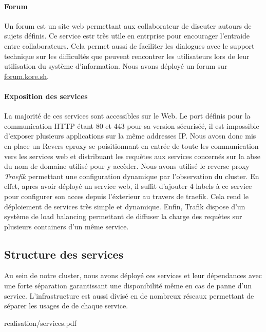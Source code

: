 \paragraph{Forum} Un forum est un site web permettant aux collaborateur de discuter autours de sujets définis.
Ce service estr très utile en entrprise pour encourager l'entraide entre collaborateurs.
Cela permet aussi de faciliter les dialogues avec le support technique sur les difficultés que peuvent rencontrer les utilisateurs lors de leur utilisation du système d'information.
Nous avons déployé un forum sur \url{forum.kore.sh}.

\paragraph{Exposition des services} La majorité de ces services sont accessibles sur le Web.
Le port définis pour la communication HTTP étant 80 et 443 pour sa version sécuriséé, il est impossible d'exposer plusieurs applications sur la même addresses IP.
Nous avosn donc mis en place un Revers eproxy se poisitionnant en entrée de toute les communication vers les services web et distribuant les requètes aux services concernés sur la abse du nom de domaine utilisé pour y accèder.
Nous avons utilisé le reverse proxy \emph{Traefik} permettant une configuration dynamique par l'observation du cluster.
En effet, apres avoir déployé un service web, il suffit d'ajouter 4 labels à ce service pour configurer son acces depuis l'éxterieur au travers de traefik.
Cela rend le déploiement de services très simple et dynamique.
Enfin, Trafik dispose d'un système de load balancing permettant de diffuser la charge des requètes sur plusieurs containers d'un même service.

\subsection{Structure des services}

Au sein de notre cluster, nous avons déployé ces services et leur dépendances avec une forte séparation garantissant une disponibilité même en cas de panne d'un service.
L'infrastructure est aussi divisé en de nombreux réseaux permettant de séparer les usages de de chaque service.

\begin{figue}{0.94}{realisation/services.pdf}
\end{figue}

\clearpage